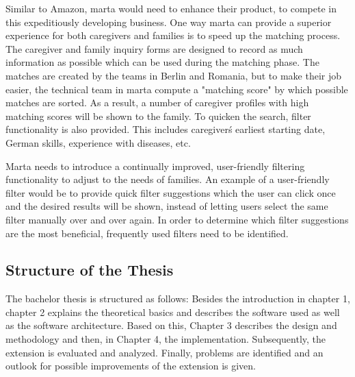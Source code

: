 Similar to Amazon, marta would need to enhance their product, to compete in this expeditiously developing business. One way marta can provide a superior experience for both caregivers and families is to speed up the matching process. The caregiver and family inquiry forms are designed to record as much information as possible which can be used during the matching phase. The matches are created by the teams in Berlin and Romania, but to make their job easier, the technical team in marta compute a "matching score" by which possible matches are sorted. As a result, a number of caregiver profiles with high matching scores will be shown to the family. To quicken the search, filter functionality is also provided. This includes caregiver\'s earliest starting date, German skills, experience with diseases, etc.

Marta needs to introduce a continually improved, user-friendly filtering functionality to adjust to the needs of families. An example of a user-friendly filter would be to provide quick filter suggestions which the user can click once and the desired results will be shown, instead of letting users select the same filter manually over and over again. In order to determine which filter suggestions are the most beneficial, frequently used filters need to be identified.

\subsection{Structure of the Thesis}

The bachelor thesis is structured as follows: Besides the introduction in chapter 1, chapter 2 explains the theoretical basics and describes the software used as well as the software architecture. Based on this, Chapter 3 describes the design and methodology and then, in Chapter 4, the implementation. Subsequently, the extension is evaluated and analyzed. Finally, problems are identified and an outlook for possible improvements of the extension is given.
